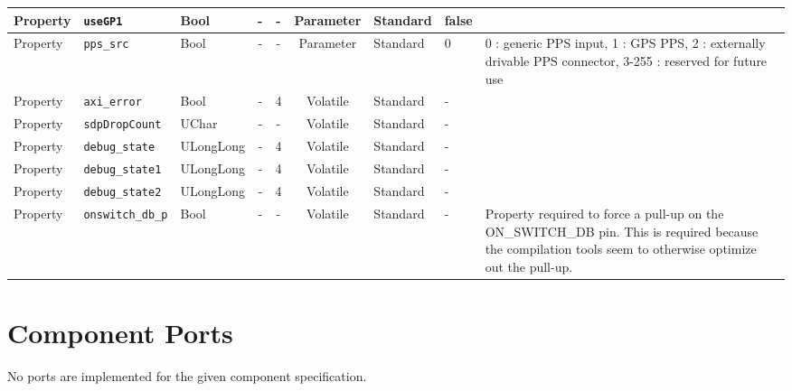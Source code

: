 \documentclass{article}
\begin{document}
\begin{landscape}
\begin{scriptsize}
\begin{tabular}{|p{1.5cm}|p{2.5cm}|p{1.5cm}|c|c|c|p{2cm}|p{1.1cm}|p{4cm}|}
			Property     & \verb+useGP1+         & Bool   & -             & -               & Parameter           & Standard    & false   &                              \\
			\hline
			Property     & \verb+pps_src+        & Bool   & -             & -               & Parameter           & Standard    & 0       & 0 : generic PPS input, 1 : GPS PPS, 2 : externally drivable PPS connector, 3-255 : reserved for future use \\
			\hline
			Property     & \verb+axi_error+      & Bool   & -             & 4               & Volatile            & Standard    & -       &                              \\
			\hline
			Property     & \verb+sdpDropCount+   & UChar  & -             & -               & Volatile            & Standard    & -       &                              \\
			\hline
			Property     & \verb+debug_state+    & ULongLong & -          & 4               & Volatile            & Standard    & -       &                              \\
			\hline
			Property     & \verb+debug_state1+   & ULongLong & -          & 4               & Volatile            & Standard    & -       &                              \\
			\hline
			Property     & \verb+debug_state2+   & ULongLong & -          & 4               & Volatile            & Standard    & -       &                              \\
			\hline
			Property     & \verb+onswitch_db_p+  & Bool  & -              & -               & Volatile            & Standard    & -       & Property required to force a pull-up on the ON\_SWITCH\_DB pin. This is required because the compilation tools seem to otherwise optimize out the pull-up.\\
			\hline
		\end{tabular}
	\end{scriptsize}

	\section*{Component Ports}
	No ports are implemented for the given component specification.


\end{landscape}
\end{document}
